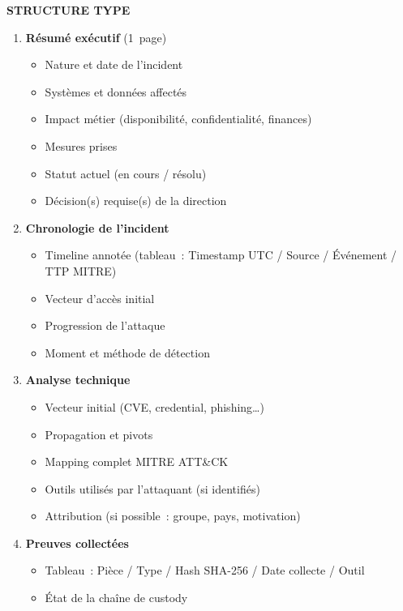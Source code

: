 \textbf{STRUCTURE TYPE}

\begin{enumerate}
  \item \textbf{Résumé exécutif} (1~page)
        \begin{itemize}
          \item Nature et date de l'incident
          \item Systèmes et données affectés
          \item Impact métier (disponibilité, confidentialité, finances)
          \item Mesures prises
          \item Statut actuel (en cours / résolu)
          \item Décision(s) requise(s) de la direction
        \end{itemize}

  \item \textbf{Chronologie de l'incident}
        \begin{itemize}
          \item Timeline annotée (tableau~: Timestamp UTC / Source / Événement / TTP MITRE)
          \item Vecteur d'accès initial
          \item Progression de l'attaque
          \item Moment et méthode de détection
        \end{itemize}

  \item \textbf{Analyse technique}
        \begin{itemize}
          \item Vecteur initial (CVE, credential, phishing…)
          \item Propagation et pivots
          \item Mapping complet MITRE ATT\&CK
          \item Outils utilisés par l'attaquant (si identifiés)
          \item Attribution (si possible~: groupe, pays, motivation)
        \end{itemize}

  \item \textbf{Preuves collectées}
        \begin{itemize}
          \item Tableau~: Pièce / Type / Hash SHA-256 / Date collecte / Outil
          \item État de la chaîne de custody
        \end{itemize}


\end{enumerate}
